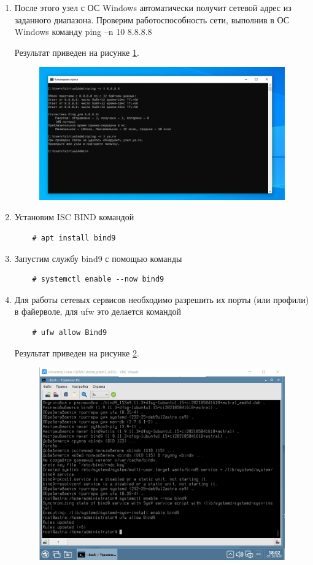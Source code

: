 \documentclass[a4paper,14pt]{extarticle}
\begin{document}
\begin{enumerate}
	\item После этого узел с ОС Windows автоматически получит сетевой адрес из
	заданного диапазона. Проверим работоспособность сети, выполнив в ОС Windows команду
	ping –n 10 8.8.8.8
	
	
	Результат приведен на рисунке \ref{fig:2022-03-3018-01-20}.
\begin{figure}[h!]
	\centering
	\includegraphics[width=0.7\linewidth]{images/Lesha/2022-03-30_18-01-20}
	\caption{}
	\label{fig:2022-03-3018-01-20}
\end{figure}

	\item Установим ISC BIND командой
	
	\begin{lstlisting}
	# apt install bind9\end{lstlisting}
	
	
	\item Запустим службу bind9 с помощью команды	
	\begin{lstlisting}
	# systemctl enable --now bind9\end{lstlisting}
	
	\item Для работы сетевых сервисов необходимо разрешить
	их порты (или профили) в файерволе, для ufw это делается командой
	\begin{lstlisting}
	# ufw allow Bind9\end{lstlisting}
	
	
		Результат приведен на рисунке \ref{fig:2022-03-3018-02-41}.
\begin{figure}[h!]
	\centering
	\includegraphics[width=0.5\linewidth]{images/Lesha/2022-03-30_18-02-41}
	\caption{}
	\label{fig:2022-03-3018-02-41}
\end{figure}


\end{enumerate}
\end{document}
